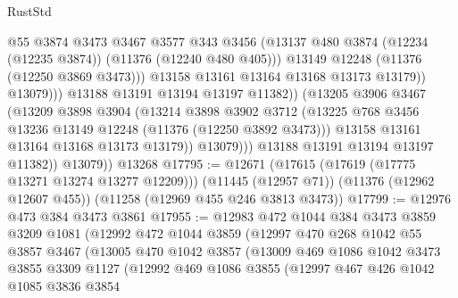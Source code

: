 \begin{lexlean}{RustStd}
\begin{coremodule}
{\begin{coremodule}
{{{{{{{{{{{{{{{{{{{{{{{{{{{{{{{{{{{{{{{{{{{{{{{{{{{{{{{{{{{{{{{{{{{{{{{{{{{{{{{{{{{{{                                @55
                                @3874
                                @3473
                                @3467
                                @3577
                                @343
                                @3456
                                (@13137
                                  @480
                                  @3874
                                  (@12234 (@12235 @3874))
                                  (@11376 (@12240 @480 @405)))
                                @13149
                                @12248
                                (@11376 (@12250 @3869 @3473)))
                              @13158
                              @13161
                              @13164
                              @13168
                              @13173
                              @13179))
                          @13079)))
                    @13188
                    @13191
                    @13194
                    @13197
                    @11382))
                (@13205
                  @3906
                  @3467
                  (@13209
                    @3898
                    @3904
                    (@13214
                      @3898
                      @3902
                      @3712
                      (@13225 @768 @3456 @13236 @13149 @12248 (@11376 (@12250 @3892 @3473)))
                      @13158
                      @13161
                      @13164
                      @13168
                      @13173
                      @13179))
                  @13079)))
            @13188
            @13191
            @13194
            @13197
            @11382))
        @13079))
    @13268
@17795 := @12671
    (@17615 (@17619 (@17775 @13271 @13274 @13277 @12209)))
    (@11445 (@12957 @71))
    (@11376 (@12962 @12607 @455))
    (@11258 (@12969 @455 @246 @3813 @3473))
@17799 := @12976 @473 @384 @3473 @3861
@17955 := @12983
    @472
    @1044
    @384
    @3473
    @3859
    @3209
    @1081
    (@12992
      @472
      @1044
      @3859
      (@12997
        @470
        @268
        @1042
        @55
        @3857
        @3467
        (@13005
          @470
          @1042
          @3857
          (@13009
            @469
            @1086
            @1042
            @3473
            @3855
            @3309
            @1127
            (@12992
              @469
              @1086
              @3855
              (@12997
                @467
                @426
                @1042
                @1085
                @3836
                @3854
}}}}}}}}}}}}}}}}}}}}}}}}}}}}}}}}}}}}}}}}}}}}}}}}}}}}}}}}}}}}}}}}}}}}}}}}}}}}}}}}}}}}}
\end{coremodule}}
\end{coremodule}
\end{lexlean}
